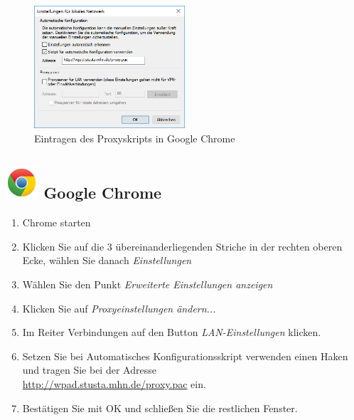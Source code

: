 \documentclass[a4paper,12pt]{scrartcl}
\begin{document}
\newpage
\begin{figure}
	\vspace{-40pt}
	\begin{center}
		\includegraphics[width=0.5\textwidth,keepaspectratio]{Bilder/Proxy_IE.png}
	\end{center}
	\caption{Eintragen des Proxyskripts in Google Chrome}
\end{figure}
\subsection*{\includegraphics[height=1.2cm,keepaspectratio]{Bilder/Chrome_2011_logo} Google Chrome}
\begin{enumerate}
	\item Chrome starten
	\item Klicken Sie auf die 3 übereinanderliegenden Striche in der rechten oberen Ecke, wählen Sie danach \emph{Einstellungen}
	\item Wählen Sie den Punkt \emph{Erweiterte Einstellungen anzeigen}
	\item Klicken Sie auf \emph{Proxyeinstellungen ändern...}
	\item Im Reiter Verbindungen auf den Button \emph{LAN-Ein\-stellungen} klicken.
	\item Setzen Sie bei Automatisches Konfigurationsskript verwenden einen Haken und tragen Sie bei der Adresse \\ \url{http://wpad.stusta.mhn.de/proxy.pac} ein.
	\item Bestätigen Sie mit OK und schließen Sie die restlichen Fenster.
	\\
	\\
\end{enumerate}
\end{document}
